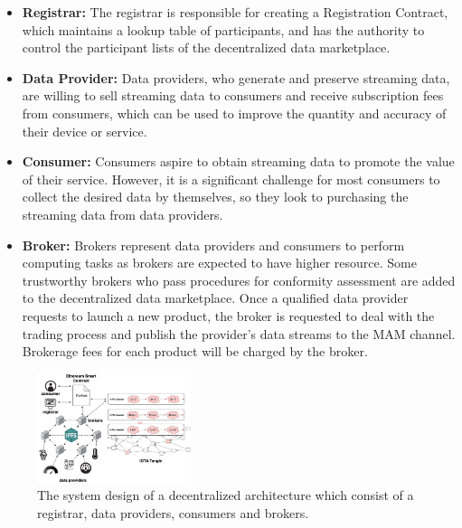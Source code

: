\documentclass[journal,article,submit,moreauthors,pdftex]{Definitions/mdpi}
\begin{document}
\begin{itemize}[leftmargin=*,labelsep=5.8mm]
\item \textbf{Registrar: }
The registrar is responsible for creating a Registration Contract, which maintains a lookup table of participants, and has the authority to control the participant lists of the decentralized data marketplace.
\item \textbf{Data Provider: }
Data providers, who generate and preserve streaming data, are willing to sell streaming data to consumers and receive subscription fees from consumers, which can be used to improve the quantity and accuracy of their device or service.
\item \textbf{Consumer: }
Consumers aspire to obtain streaming data to promote the value of their service. However, it is a significant challenge for most consumers to collect the desired data by themselves, so they look to purchasing the streaming data from data providers.
\item \textbf{Broker: }
Brokers represent data providers and consumers to perform computing tasks as brokers are expected to have higher resource. Some trustworthy brokers who pass procedures for conformity assessment are added to the decentralized data marketplace. Once a qualified data provider requests to launch a new product, the broker is requested to deal with the trading process and publish the provider’s data streams to the MAM channel. Brokerage fees for each product will be charged by the broker.
\end{itemize}

\begin{figure}[h]
    \centering
    \includegraphics[width=0.4\textwidth]{system_design}
    \caption{The system design of a decentralized architecture which consist of a registrar, data providers, consumers and brokers.}
    \label{fig:system_design}
\end{figure}
\end{document}
